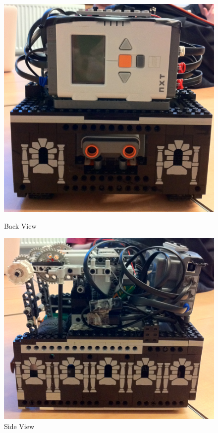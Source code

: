 \documentclass[12pt, a4paper, titlepage]{article}
\begin{document}
\begin{figure}[ht]
\begin{minipage}[b]{0.5\linewidth}
\centering
\includegraphics[scale=0.2]{images/robot/backview.jpg}
\caption{Back View}
\label{fig:backview}
\end{minipage}
\hspace{0.5cm}
\begin{minipage}[b]{0.5\linewidth}
\centering
\includegraphics[scale=0.2]{images/robot/sideview.jpg}
\caption{Side View}
\label{fig:sideview}
\end{minipage}
\end{figure}
\end{document}

